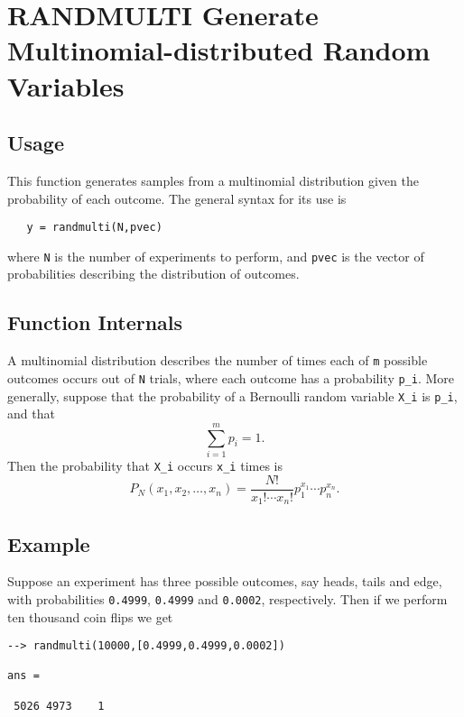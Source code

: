 \section{RANDMULTI Generate Multinomial-distributed Random Variables}

\subsection{Usage}

This function generates samples from a multinomial distribution
given the probability of each outcome.  The general syntax for
its use is
\begin{verbatim}
   y = randmulti(N,pvec)
\end{verbatim}
where \verb|N| is the number of experiments to perform, and \verb|pvec|
is the vector of probabilities describing the distribution of
outcomes.
\subsection{Function Internals}

A multinomial distribution describes the number of times each
of \verb|m| possible outcomes occurs out of \verb|N| trials, where each
outcome has a probability \verb|p_i|.  More generally, suppose that
the probability of a Bernoulli random variable \verb|X_i| is \verb|p_i|,
and that 
\[
   \sum_{i=1}^{m} p_i = 1.
\]
Then the probability that \verb|X_i| occurs \verb|x_i| times is
\[
   P_N(x_1,x_2,\ldots,x_n) = \frac{N!}{x_1!\cdots x_n!} p_1^{x_1}\cdots p_n^{x_n}.
\]
\subsection{Example}

Suppose an experiment has three possible outcomes, say heads,
tails and edge, with probabilities \verb|0.4999|, \verb|0.4999| and
\verb|0.0002|, respectively.  Then if we perform ten thousand coin
flips we get
\begin{verbatim}
--> randmulti(10000,[0.4999,0.4999,0.0002])

ans = 

 5026 4973    1 
\end{verbatim}

